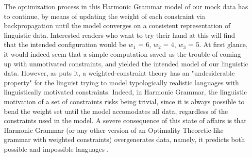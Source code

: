 The optimization process in this Harmonic Grammar model of our mock data has to continue, by means of updating the weight of each constraint via backpropagation until the model converges on a consistent representation of linguistic data. Interested readers who want to try their hand at this will find that the intended configuration would be $w_1$ = 6, $w_2$ = 4, $w_3$ = 5. At first glance, it would indeed seem that a simple computation saved us the trouble of coming up with unmotivated constraints, and yielded the intended model of our linguistic data. However, as \textcite{kuhn2002corpus} puts it, a weighted-constraint theory has an "undesiderable property" for the linguist trying to model typologically realistic languages with linguistically motivated constraints. Indeed, in Harmonic Grammar, the linguistic motivation of a set of constraints risks being trivial, since it is always possible to bend the weight set until the model accomodates all data, regardless of the constraints used in the model. A severe consequence of this state of affairs is that Harmonic Grammar (or any other version of an Optimality Theoretic-like grammar with weighted constraints) overgenerates data, namely, it predicts both possible and impossible languages \parencite{legendre2006optimality, pater2009weighted}.\\
